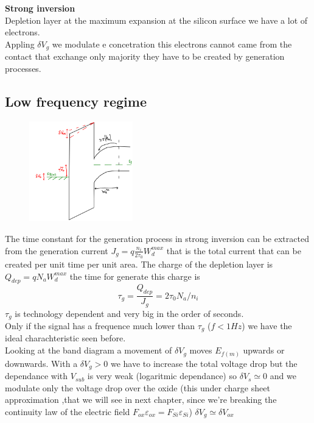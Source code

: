 \vspace{5mm}
{\bf Strong inversion}\\
Depletion layer at the maximum expansion at the silicon surface we have a lot of electrons.\\ 
Appling $\delta V_g$ we modulate e concetration this electrons cannot came from the contact that exchange only majority they have to be created by generation processes.\\

\subsection{Low frequency regime}

\begin{figure}
\includegraphics[width=0.4\textwidth]{lfbd.png}
\end{figure}
The time constant for the generation process in strong inversion can be extracted from the generation current $J_g=q\frac{n_i}{2\tau_0}W_d^{max}$ that is the total current that can be created per unit time per unit area. The charge of the depletion layer is $Q_{dep}=qN_aW_d^{max}$ the time for generate this charge is 
\begin{equation}
\tau_g=\frac{Q_{dep}}{J_g}=2\tau_0N_a/n_i
\end{equation}
$\tau_g$ is technology dependent and very big in the order of seconds.\\
Only if the signal has a frequence much lower than $\tau_g$ ($f<1Hz$) we have the ideal charachteristic seen before.\\
Looking at the band diagram a movement of $\delta V_g$ moves $E_{f(m)}$ upwards or downwards. With a $\delta V_g>0$ we have to increase the total voltage drop but the dependance with $V_{sub}$ is very weak (logaritmic dependance) so $\delta V_s\simeq 0$ and we modulate only the voltage drop over the oxide (this under charge sheet approximation ,that we will see in next chapter, since we're  breaking the continuity law of the electric field $F_{ox}\varepsilon_{ox}=F_{Si}\varepsilon_{Si}$) $\delta V_g\simeq \delta V_{ox}$



